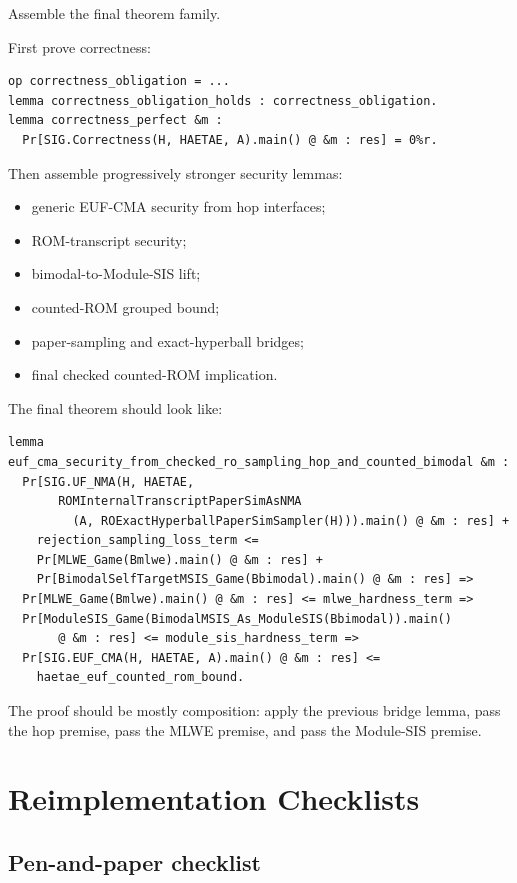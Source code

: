 \documentclass[11pt]{report}
\theoremstyle{definition}
\theoremstyle{plain}
\begin{document}
Assemble the final theorem family.

First prove correctness:

\begin{lstlisting}[language=EasyCrypt]
op correctness_obligation = ...
lemma correctness_obligation_holds : correctness_obligation.
lemma correctness_perfect &m :
  Pr[SIG.Correctness(H, HAETAE, A).main() @ &m : res] = 0%r.
\end{lstlisting}

Then assemble progressively stronger security lemmas:

\begin{itemize}
\item generic EUF-CMA security from hop interfaces;
\item ROM-transcript security;
\item bimodal-to-Module-SIS lift;
\item counted-ROM grouped bound;
\item paper-sampling and exact-hyperball bridges;
\item final checked counted-ROM implication.
\end{itemize}

The final theorem should look like:

\begin{lstlisting}[language=EasyCrypt]
lemma euf_cma_security_from_checked_ro_sampling_hop_and_counted_bimodal &m :
  Pr[SIG.UF_NMA(H, HAETAE,
       ROMInternalTranscriptPaperSimAsNMA
         (A, ROExactHyperballPaperSimSampler(H))).main() @ &m : res] +
    rejection_sampling_loss_term <=
    Pr[MLWE_Game(Bmlwe).main() @ &m : res] +
    Pr[BimodalSelfTargetMSIS_Game(Bbimodal).main() @ &m : res] =>
  Pr[MLWE_Game(Bmlwe).main() @ &m : res] <= mlwe_hardness_term =>
  Pr[ModuleSIS_Game(BimodalMSIS_As_ModuleSIS(Bbimodal)).main()
       @ &m : res] <= module_sis_hardness_term =>
  Pr[SIG.EUF_CMA(H, HAETAE, A).main() @ &m : res] <=
    haetae_euf_counted_rom_bound.
\end{lstlisting}

The proof should be mostly composition: apply the previous bridge lemma, pass
the hop premise, pass the MLWE premise, and pass the Module-SIS premise.

\chapter{Reimplementation Checklists}

\section{Pen-and-paper checklist}
\end{document}
